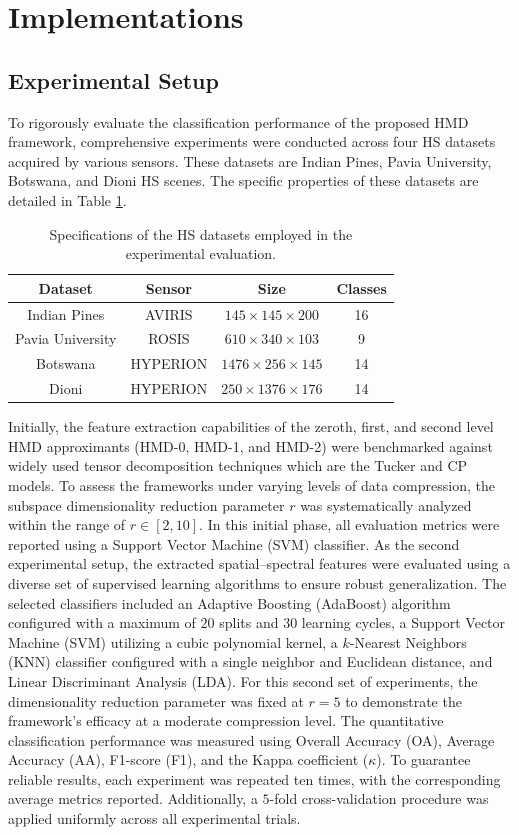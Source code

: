 \documentclass[12pt,onecolumn]{article}
\begin{document}
\section{Implementations}
\label{sec:results}

\subsection{Experimental Setup}

To rigorously evaluate the classification performance of the proposed HMD framework, comprehensive experiments were conducted across four HS datasets acquired by various sensors. These datasets are Indian Pines, Pavia University, Botswana, and Dioni HS scenes. The specific properties of these datasets are detailed in Table \ref{tab:datasets}.
\begin{table}[h!]
\centering
\begin{tabular}{cccc}
\hline
Dataset & Sensor & Size & Classes \\
\hline
Indian Pines & AVIRIS & $145\times 145\times 200$ & 16 \\
Pavia University & ROSIS & $610\times 340\times 103$ & 9 \\
Botswana & HYPERION & $1476\times 256\times 145$ & 14 \\
Dioni & HYPERION & $250\times 1376\times 176$ & 14 \\
\hline
\end{tabular}
\caption{Specifications of the HS datasets employed in the experimental evaluation.}
\label{tab:datasets}
\end{table}
Initially, the feature extraction capabilities of the zeroth, first, and second level HMD approximants (HMD-0, HMD-1, and HMD-2) were benchmarked against widely used tensor decomposition techniques which are the Tucker and CP models. To assess the frameworks under varying levels of data compression, the subspace dimensionality reduction parameter $r$ was systematically analyzed within the range of $r \in [2, 10]$. In this initial phase, all evaluation metrics were reported using a Support Vector Machine (SVM) classifier. As the second experimental setup, the extracted spatial–spectral features were evaluated using a diverse set of supervised learning algorithms to ensure robust generalization. The selected classifiers included an Adaptive Boosting (AdaBoost) algorithm configured with a maximum of $20$ splits and $30$ learning cycles, a Support Vector Machine (SVM) utilizing a cubic polynomial kernel, a $k$-Nearest Neighbors (KNN) classifier configured with a single neighbor and Euclidean distance, and Linear Discriminant Analysis (LDA). For this second set of experiments, the dimensionality reduction parameter was fixed at $r = 5$ to demonstrate the framework's efficacy at a moderate compression level. The quantitative classification performance was measured using Overall Accuracy (OA), Average Accuracy (AA), F1-score (F1), and the Kappa coefficient ($\kappa$). To guarantee reliable results, each experiment was repeated ten times, with the corresponding average metrics reported. Additionally, a $5$-fold cross-validation procedure was applied uniformly across all experimental trials.
\end{document}
